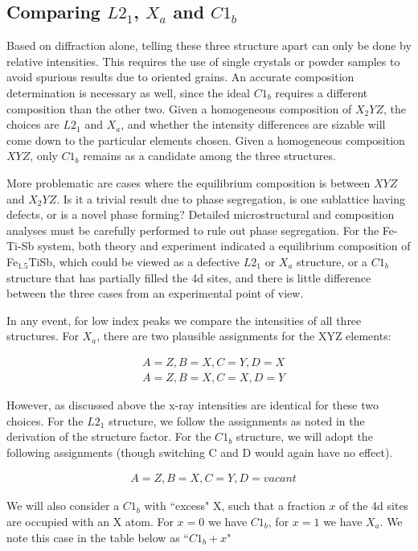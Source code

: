 \documentclass[aps,amsmath,amssymb,prb,superscriptaddress,longtable,preprint,fleqn]{revtex4}
\begin{document}
\subsection{Comparing $L2_1$, $X_a$ and $C1_b$}

Based on diffraction alone, telling these three structure apart can only be done by relative intensities. This requires the use of single crystals or powder samples to avoid spurious results due to oriented grains. An accurate composition determination is necessary as well, since the ideal $C1_b$ requires a different composition than the other two. Given a homogeneous composition of $X_2YZ$, the choices are $L2_1$ and $X_a$, and whether the intensity differences are sizable will come down to the particular elements chosen. Given a homogeneous composition $XYZ$, only $C1_b$ remains as a candidate among the three structures. 

More problematic are cases where the equilibrium composition is between $XYZ$ and $X_2YZ$. Is it a trivial result due to phase segregation, is one sublattice having defects, or is a novel phase forming? Detailed microstructural and composition analyses must be carefully performed to rule out phase segregation. For the Fe-Ti-Sb system,\cite{FeTiSb} both theory and experiment indicated a equilibrium composition of Fe$_{1.5}$TiSb, which could be viewed as a defective $L2_1$ or $X_a$ structure, or a $C1_b$ structure that has partially filled the 4d sites, and there is little difference between the three cases from an experimental point of view. 

In any event, for low index peaks we compare the intensities of all three structures. For $X_a$, there are two plausible assignments for the XYZ elements:

\begin{align}
&A=Z, B=X, C=Y, D=X\\
&A=Z, B=X, C=X, D=Y
\end{align}

However,  as discussed above the x-ray intensities are identical for these two choices. For the $L2_1$ structure, we follow the assignments as noted in the derivation of the structure factor. For the $C1_b$ structure, we will adopt the following assignments (though switching C and D would again have no effect).

\begin{align}
&A=Z, B=X, C=Y, D=vacant
\end{align}

We will also consider a $C1_b$ with ``excess" X, such that a fraction $x$ of the 4d sites are occupied with an X atom. For $x=0$ we have $C1_b$, for $x=1$ we have $X_a$. We note this case in the table below as ``$C1_b+x$" 
\end{document}
